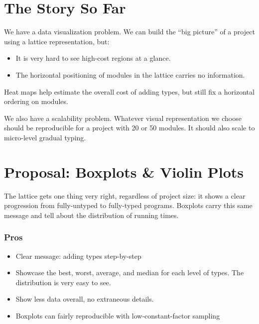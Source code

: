 \documentclass{article}
\begin{document}
\section{The Story So Far}
We have a data visualization problem.
We can build the ``big picture'' of a project using a lattice representation, but:
\begin{itemize}
\item
  It is very hard to see high-cost regions at a glance.
\item
  The horizontal positioning of modules in the lattice carries no information.
\end{itemize}

Heat maps help estimate the overall cost of adding types, but still fix a horizontal ordering on modules.

We also have a scalability problem.
Whatever visual representation we choose should be reproducible for a project with 20 or 50 modules.
It should also scale to micro-level gradual typing.


\section{Proposal: Boxplots \& Violin Plots}
The lattice gets one thing very right, regardless of project size: it shows a clear progression from fully-untyped to fully-typed programs.
Boxplots carry this same message and tell about the distribution of running times.

\subsubsection*{Pros}
\begin{itemize}
\item
  Clear message: adding types step-by-step
\item
  Showcase the best, worst, average, and median for each level of types.
  The distribution is very easy to see.
\item
  Show less data overall, no extraneous details.
\item
  Boxplots can fairly reproducible with low-constant-factor sampling
\end{itemize}
\end{document}
